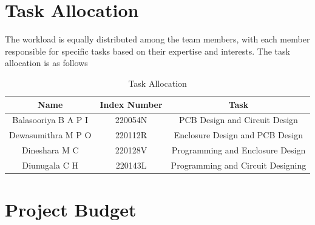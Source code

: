 \documentclass[a4paper,11pt]{article}%
\begin{document}
\section{Task Allocation}
The workload is equally distributed among the team members, with each member responsible for specific tasks based on their expertise and interests. The task allocation is as follows
\begin{table}[h]
    \centering
    \begin{tabular}{|c|c|c|}
        \hline
        \textbf{Name} & \textbf{Index Number} & \textbf{Task} \\ \hline
        Balasooriya B A P I	 & 220054N & PCB Design and Circuit Design \\ \hline
        Dewasumithra M P O & 220112R & Enclosure Design and PCB Design \\ \hline
        Dineshara M C & 220128V & Programming and Enclosure Design \\ \hline
        Diunugala C H & 220143L & Programming and Circuit Designing \\ \hline
    \end{tabular}
    \caption{Task Allocation}
    \label{tab:sample_table}
\end{table}
\section{Project Budget}
\end{document}
